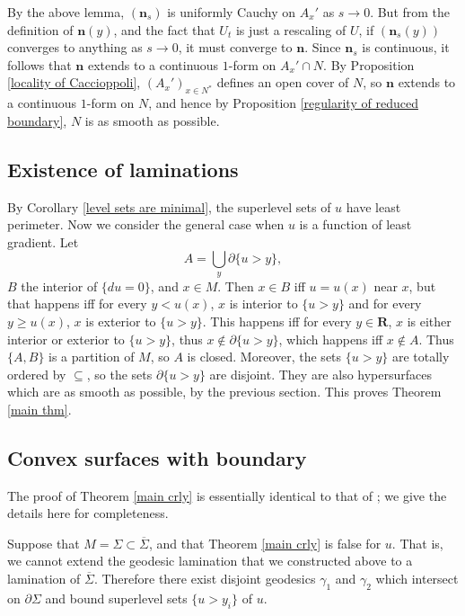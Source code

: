 \documentclass[reqno,12pt,letterpaper]{amsart}
\newcommand{\RR}{\mathbf{R}}
\newcommand{\normal}{\mathbf n}
\theoremstyle{definition}
\numberwithin{equation}{section}
\begin{document}
By the above lemma, $(\normal_s)$ is uniformly Cauchy on $A_x'$ as $s \to 0$.
But from the definition of $\normal(y)$, and the fact that $U_t$ is just a rescaling of $U$, if $(\normal_s(y))$ converges to anything as $s \to 0$, it must converge to $\normal$.
Since $\normal_s$ is continuous, it follows that $\normal$ extends to a continuous $1$-form on $A_x' \cap N$.
By Proposition \ref{locality of Caccioppoli}, $(A_x')_{x \in N^*}$ defines an open cover of $N$, so $\normal$ extends to a continuous $1$-form on $N$, and hence by Proposition \ref{regularity of reduced boundary}, $N$ is as smooth as possible.

\subsection{Existence of laminations}
By Corollary \ref{level sets are minimal}, the superlevel sets of $u$ have least perimeter.
Now we consider the general case when $u$ is a function of least gradient.
Let
\begin{equation}\label{lamination union}
A = \bigcup_y \partial \{u > y\},
\end{equation} $B$ the interior of $\{du = 0\}$, and $x \in M$.
Then $x \in B$ iff $u = u(x)$ near $x$, but that happens iff for every $y < u(x)$, $x$ is interior to $\{u > y\}$ and for every $y \geq u(x)$, $x$ is exterior to $\{u > y\}$.
This happens iff for every $y \in \RR$, $x$ is either interior or exterior to $\{u > y\}$, thus $x \notin \partial \{u > y\}$, which happens iff $x \notin A$.
Thus $\{A, B\}$ is a partition of $M$, so $A$ is closed.
Moreover, the sets $\{u > y\}$ are totally ordered by $\subseteq$, so the sets $\partial \{u > y\}$ are disjoint.
They are also hypersurfaces which are as smooth as possible, by the previous section.
This proves Theorem \ref{main thm}.

\subsection{Convex surfaces with boundary}
The proof of Theorem \ref{main crly} is essentially identical to that of \cite[Proposition 3.4]{górny2017planar}; we give the details here for completeness.

Suppose that $M = \Sigma \subset \overline \Sigma$, and that Theorem \ref{main crly} is false for $u$.
That is, we cannot extend the geodesic lamination that we constructed above to a lamination of $\overline \Sigma$.
Therefore there exist disjoint geodesics $\gamma_1$ and $\gamma_2$ which intersect on $\partial \Sigma$ and bound superlevel sets $\{u > y_i\}$ of $u$.
\end{document}
